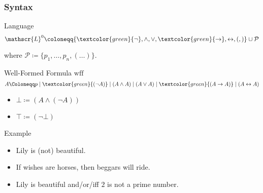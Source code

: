 \documentclass[UTF8,aspectratio=43,11pt,colorlinks,compress,openany]{beamer}%
\begin{document}
\begin{frame}\frametitle{Syntax}
		\begin{block}{Language}
			\[\mathscr{L}^0\coloneqq \{\textcolor{green}{\neg},\wedge,\vee,\textcolor{green}{\to},\leftrightarrow,(,)\}\cup\mathcal{P}\]
		\end{block}
		where $\mathcal{P}\coloneqq \{p_1,\dots,p_n,(\dots)\}$.
		\begin{block}{Well-Formed Formula $\mathrm{wff}$}
			\[A\Coloneqq p\mid \textcolor{green}{(\neg A)}\mid (A\wedge A)\mid (A\vee A)\mid \textcolor{green}{(A\to A)}\mid (A\leftrightarrow A)\]
		\end{block}
		\begin{itemize}
			\item $\bot\coloneqq (A\wedge(\neg A))$
			\item $\top\coloneqq (\neg\bot)$
		\end{itemize}
		\begin{block}{Example}
			\begin{itemize}
				\item Lily is (not) beautiful.
				\item If wishes are horses, then beggars will ride.
				\item Lily is beautiful and/or/iff $2$ is not a prime number.
			\end{itemize}
		\end{block}
\end{frame}
\end{document}

